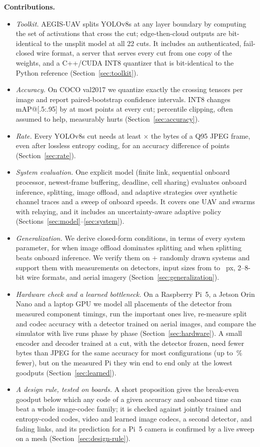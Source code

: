 \documentclass[journal,twocolumn,10pt]{IEEEtran}
\begin{document}
\textbf{Contributions.}
\begin{itemize}
\item \emph{Toolkit.} AEGIS-UAV splits YOLOv8s at any layer boundary by computing the set of activations that cross the cut; edge-then-cloud outputs are bit-identical to the unsplit model at all 22 cuts. It includes an authenticated, fail-closed wire format, a server that serves every cut from one copy of the weights, and a C++/CUDA INT8 quantizer that is bit-identical to the Python reference (Section~\ref{sec:toolkit}).
\item \emph{Accuracy.} On COCO val2017 we quantize exactly the crossing tensors per image and report paired-bootstrap confidence intervals. INT8 changes mAP@[.5:.95] by at most \MaxAbsDeltaINT{} points at every cut; percentile clipping, often assumed to help, measurably hurts (Section~\ref{sec:accuracy}).
\item \emph{Rate.} Every YOLOv8s cut needs at least \RatioMinSplitOverJPEGQNinetyFive$\times$ the bytes of a Q95 JPEG frame, even after lossless entropy coding, for an accuracy difference of \JPEGLossQNinetyFive{} points (Section~\ref{sec:rate}).
\item \emph{System evaluation.} One explicit model (finite link, sequential onboard processor, newest-frame buffering, deadline, cell sharing) evaluates onboard inference, splitting, image offload, and adaptive strategies over synthetic channel traces and a sweep of onboard speeds. It covers one UAV and swarms with relaying, and it includes an uncertainty-aware adaptive policy (Sections~\ref{sec:model}--\ref{sec:system}).
\item \emph{Generalization.} We derive closed-form conditions, in terms of every system parameter, for when image offload dominates splitting and when splitting beats onboard inference. We verify them on \GenNScenarios{} + \GenNSwarmScenarios{} randomly drawn systems and support them with measurements on \GenNModels{} detectors, input sizes from \GenResSizeSmall{} to \GenResSizeLarge~px, 2--8-bit wire formats, and aerial imagery (Section~\ref{sec:generalization}).
\item \emph{Hardware check and a learned bottleneck.} On a Raspberry Pi~5, a Jetson Orin Nano and a laptop GPU we model all \HwNPlacements{} placements of the detector from measured component timings, run the important ones live, re-measure split and codec accuracy with a detector trained on aerial images, and compare the simulator with live runs phase by phase (Section~\ref{sec:hardware}). A small encoder and decoder trained at a cut, with the detector frozen, need fewer bytes than JPEG for the same accuracy for most configurations (up to \LbKFourSavingMax\,\% fewer), but on the measured Pi they win end to end only at the lowest goodputs (Section~\ref{sec:learned}).
\item \emph{A design rule, tested on boards.} A short proposition gives the break-even goodput below which any code of
a given accuracy and onboard time can beat a whole image-codec family; it is checked against jointly trained and
entropy-coded codes, video and learned image codecs, a second detector, and fading links, and its prediction for a
Pi~5 camera is confirmed by a live sweep on a mesh (Section~\ref{sec:design-rule}).
\end{itemize}
\end{document}
